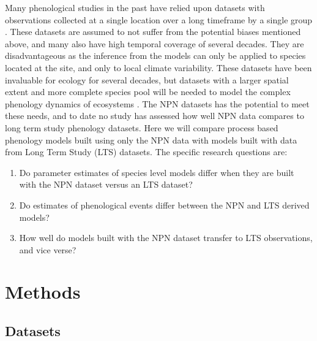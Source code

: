 \documentclass[fleqn,10pt,lineno]{wlpeerj} %
\begin{document}
Many phenological studies in the past have relied upon datasets with observations collected at a single location over a long timeframe by a single group \citep{cook2012, roberts2015, clark2014}. These datasets are assumed to not suffer from the potential biases mentioned above, and many also have high temporal coverage of several decades. They are disadvantageous as the inference from the models can only be applied to species located at the site, and only to local climate variability. These datasets have been invaluable for ecology for several decades, but datasets with a larger spatial extent and more complete species pool will be needed to model the complex phenology dynamics of ecosystems \citep{richardson2012, diez2012, caradonna2014}. The NPN datasets has the potential to meet these needs, and to date no study has assessed how well NPN data compares to long term study phenology datasets. Here we will compare process based phenology models built using only the NPN data with models built with data from Long Term Study (LTS) datasets. The specific research questions are:
\begin{enumerate}
\item Do parameter estimates of species level models differ when they are built with the NPN dataset versus an LTS dataset?
\item Do estimates of phenological events differ between the NPN and LTS derived models?
\item How well do models built with the NPN dataset transfer to LTS observations, and vice verse?
\end{enumerate}


\section*{Methods}

\subsection*{Datasets}
\end{document}
